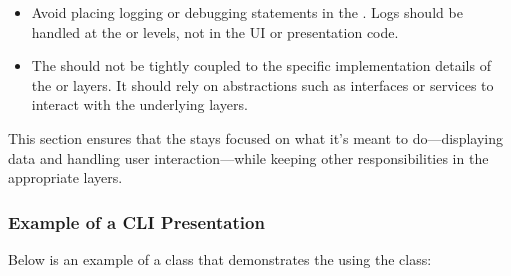 \documentclass[letterpaper,10pt,english]{sphinxhowto}
\begin{document}
\begin{itemize}
\begin{description}
\end{description}

\item {} \begin{description}
\sphinxAtStartPar
Avoid placing logging or debugging statements in the . Logs should be handled at the  or  levels, not in the UI or presentation code.

\end{description}

\item {} \begin{description}
\sphinxAtStartPar
The  should not be tightly coupled to the specific implementation details of the  or  layers. It should rely on abstractions such as interfaces or services to interact with the underlying layers.

\end{description}

\end{itemize}

\sphinxAtStartPar
This section ensures that the  stays focused on what it’s meant to do—displaying data and handling user interaction—while keeping other responsibilities in the appropriate layers.


\subsubsection{Example of a CLI Presentation}
\label{\detokenize{architecture/presentation/index:example-of-a-cli-presentation}}
\sphinxAtStartPar
Below is an example of a class that demonstrates the  using the  class:
\end{document}
